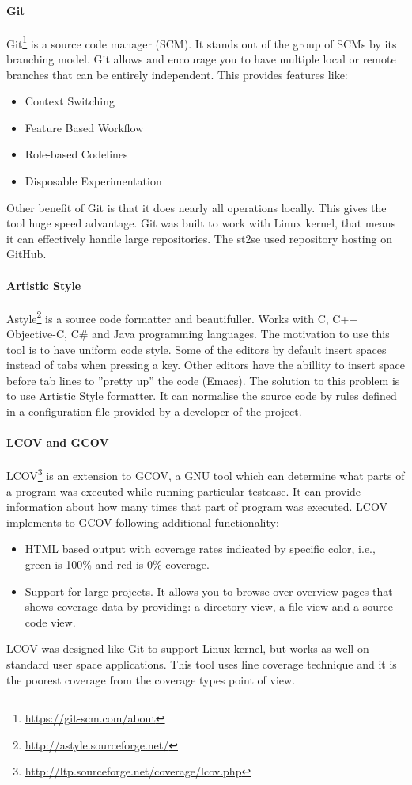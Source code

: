 \paragraph{Git}
Git\footnote{\url{https://git-scm.com/about}} is a source code manager (SCM). It stands out of the group of SCMs by its branching model.
Git allows and encourage you to have multiple local or remote branches that can be entirely independent.
This provides features like:
\begin{itemize}
	\item Context Switching
	\item Feature Based Workflow
	\item Role-based Codelines
	\item Disposable Experimentation
\end{itemize}
Other benefit of Git is that it does nearly all operations locally.
This gives the tool huge speed advantage.
Git was built to work with Linux kernel, that means it can effectively handle large repositories.
The st2se used repository hosting on GitHub.

\paragraph{Artistic Style}
Astyle\footnote{\url{http://astyle.sourceforge.net/}} is a source code formatter and beautifuller.
Works with C, C++ Objective-C, C\# and Java programming languages.
The motivation to use this tool is to have uniform code style.
Some of the editors by default insert spaces instead of tabs when pressing a key.
Other editors have the abillity to insert space before tab lines to ''pretty up'' the code (Emacs).
The solution to this problem is to use Artistic Style formatter.
It can normalise the source code by rules defined in a configuration file provided by a developer of the project.

\paragraph{LCOV and GCOV}
LCOV\footnote{\url{http://ltp.sourceforge.net/coverage/lcov.php}} is an extension to GCOV, a GNU tool which can determine what parts of a program was executed while running particular testcase.
It can provide information about how many times that part of program was executed.
LCOV implements to GCOV following additional functionality:
\begin{itemize}
	\item HTML based output with coverage rates indicated by specific color, i.e., green is 100\% and red is 0\% coverage.
	\item Support for large projects. It allows you to browse over overview pages that shows coverage data
	by providing: a directory view, a file view and a source code view.
\end{itemize}
LCOV was designed like Git to support Linux kernel, but works as well on standard user space applications.
This tool uses line coverage technique and it is the poorest coverage from the coverage types point of view.


